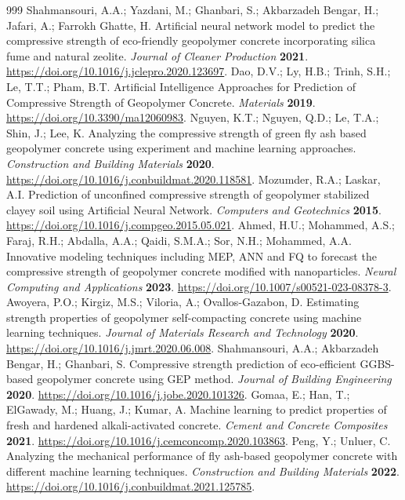 \documentclass[materials,article,submit,pdftex,moreauthors]{Definitions/mdpi}
\begin{document}
\begin{thebibliography}{999}
Shahmansouri, A.A.; Yazdani, M.; Ghanbari, S.; Akbarzadeh Bengar, H.; Jafari, A.; Farrokh Ghatte, H. Artificial neural network model to predict the compressive strength of eco-friendly geopolymer concrete incorporating silica fume and natural zeolite. {\em Journal of Cleaner Production} {\bf 2021}. \url{https://doi.org/10.1016/j.jclepro.2020.123697}.
Dao, D.V.; Ly, H.B.; Trinh, S.H.; Le, T.T.; Pham, B.T. Artificial Intelligence Approaches for Prediction of Compressive Strength of Geopolymer Concrete. {\em Materials} {\bf 2019}. \url{https://doi.org/10.3390/ma12060983}.
Nguyen, K.T.; Nguyen, Q.D.; Le, T.A.; Shin, J.; Lee, K. Analyzing the compressive strength of green fly ash based geopolymer concrete using experiment and machine learning approaches. {\em Construction and Building Materials} {\bf 2020}. \url{https://doi.org/10.1016/j.conbuildmat.2020.118581}.
Mozumder, R.A.; Laskar, A.I. Prediction of unconfined compressive strength of geopolymer stabilized clayey soil using Artificial Neural Network. {\em Computers and Geotechnics} {\bf 2015}. \url{https://doi.org/10.1016/j.compgeo.2015.05.021}.
Ahmed, H.U.; Mohammed, A.S.; Faraj, R.H.; Abdalla, A.A.; Qaidi, S.M.A.; Sor, N.H.; Mohammed, A.A. Innovative modeling techniques including MEP, ANN and FQ to forecast the compressive strength of geopolymer concrete modified with nanoparticles. {\em Neural Computing and Applications} {\bf 2023}. \url{https://doi.org/10.1007/s00521-023-08378-3}.
Awoyera, P.O.; Kirgiz, M.S.; Viloria, A.; Ovallos-Gazabon, D. Estimating strength properties of geopolymer self-compacting concrete using machine learning techniques. {\em Journal of Materials Research and Technology} {\bf 2020}. \url{https://doi.org/10.1016/j.jmrt.2020.06.008}.
Shahmansouri, A.A.; Akbarzadeh Bengar, H.; Ghanbari, S. Compressive strength prediction of eco-efficient GGBS-based geopolymer concrete using GEP method. {\em Journal of Building Engineering} {\bf 2020}. \url{https://doi.org/10.1016/j.jobe.2020.101326}.
Gomaa, E.; Han, T.; ElGawady, M.; Huang, J.; Kumar, A. Machine learning to predict properties of fresh and hardened alkali-activated concrete. {\em Cement and Concrete Composites} {\bf 2021}. \url{https://doi.org/10.1016/j.cemconcomp.2020.103863}.
Peng, Y.; Unluer, C. Analyzing the mechanical performance of fly ash-based geopolymer concrete with different machine learning techniques. {\em Construction and Building Materials} {\bf 2022}. \url{https://doi.org/10.1016/j.conbuildmat.2021.125785}.

\end{thebibliography}
\end{document}
